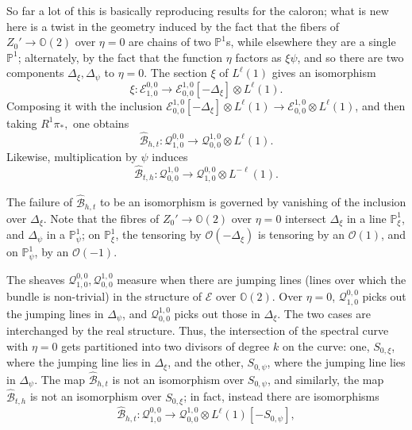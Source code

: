 \documentclass[12pt]{article}
\theoremstyle{definition}
\theoremstyle{remark}
\numberwithin{theorem}{section}
\def\bP{{\mathbb {P}}}
\def\bO{{\mathbb {O}}}
\def\pB{{\mathcal B}}
\def\pE{{\mathcal E}}
\def\pO{{\mathcal O}}
\def\pQ{{\mathcal Q}}
\begin{document}
So far a lot of this is basically reproducing results for the caloron; what is new here is a twist in the geometry induced by the fact that the fibers of  $Z_0'\rightarrow\bO(2)$ over $\eta = 0$ are chains of two $\bP^1$s, while elsewhere they are a single $\bP^1$; alternately, by the fact that the function $\eta$ factors as $\xi\psi$, and so there are two components $\Delta_\xi, \Delta_\psi$ to $\eta= 0$. The section $\xi$ of $L^\ell(1)$ gives an isomorphism
$$\xi:  \pE_{ 1,0}^{0,0}\rightarrow  \pE_{0 ,0}^{ 1,0}[-\Delta_\xi]\otimes L^{ \ell}(1).$$
Composing it with the inclusion $ \pE_{0 ,0}^{ 1,0}[-\Delta_\xi]\otimes L^{ \ell}(1)\rightarrow \pE_{0 ,0}^{ 1,0}\otimes L^{ \ell}(1)$, and 
then taking $R^1\pi_*,$ one obtains 
\begin{equation}  
\widehat \pB_{h,t}: \pQ_{1,0}^{0,0}\rightarrow  \pQ_{0 ,0}^{ 1,0}\otimes L^{ \ell}(1). \label{hatheadtail}
\end{equation}
Likewise, multiplication by $\psi$ induces 
\begin{equation}  \widehat \pB_{t,h}: \pQ^{1,0}_{0,0}\rightarrow  \pQ^{0 ,0}_{ 1,0}\otimes L^{ -\ell}(1).\label{hattailhead} \end{equation}

The failure of $\widehat \pB_{h,t}$ to be an isomorphism is governed by vanishing of the inclusion over $\Delta_\xi.$ Note that the fibres of $Z_0'\rightarrow \bO(2) $ over $\eta = 0$ intersect $\Delta_\xi$ in a line $\bP^1_\xi$, and $\Delta_\psi$ in a $\bP^1_\psi$; on $\bP^1_\xi$, the tensoring by $\pO(-\Delta_\xi)$ is tensoring by an $\pO(1)$, and on $\bP^1_\psi$,   by an $\pO(-1)$. 

The sheaves $\pQ_{ 1,0}^{0,0},\pQ_{0 ,0}^{ 1,0}$ measure when there are jumping lines (lines over which the bundle is non-trivial) in the structure of $\pE$ over $\bO(2)$. Over $\eta= 0$, $\pQ_{ 1,0}^{0,0}$ picks out the jumping lines in $\Delta_\psi$, and $\pQ_{0 ,0}^{ 1,0}$ picks out those in  $\Delta_\xi$. The two cases are interchanged by the real structure. Thus, the intersection of the spectral curve with $\eta = 0$ 
gets partitioned into two divisors of degree $k$ on the curve: one, $S_{0,\xi}$, where the jumping line lies in $\Delta_\xi$, and the other, $S_{0,\psi}$, where the jumping line lies in $\Delta_\psi$. The map $\widehat \pB_{h,t}$ is not  an isomorphism over $S_{0,\psi}$, and similarly, the map $\widehat \pB_{t,h}$ is not  an isomorphism over $S_{0,\xi}$; in fact, instead there are isomorphisms
\begin{equation}\label{shiftup}  
\widehat \pB_{h,t}: \pQ_{1,0}^{0,0}\rightarrow  \pQ_{0 ,0}^{ 1,0}\otimes L^{ \ell}(1)[-S_{0,\psi}],  
\end{equation}
 
\end{document}
